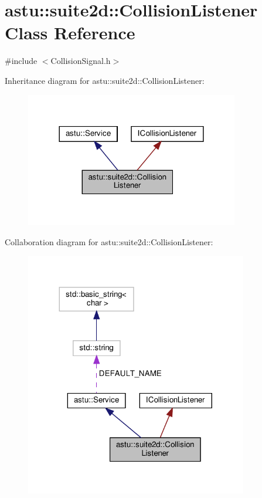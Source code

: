 \hypertarget{classastu_1_1suite2d_1_1CollisionListener}{}\section{astu\+:\+:suite2d\+:\+:Collision\+Listener Class Reference}
\label{classastu_1_1suite2d_1_1CollisionListener}


{\ttfamily \#include $<$Collision\+Signal.\+h$>$}



Inheritance diagram for astu\+:\+:suite2d\+:\+:Collision\+Listener\+:\nopagebreak
\begin{figure}[H]
\begin{center}
\leavevmode
\includegraphics[width=264pt]{classastu_1_1suite2d_1_1CollisionListener__inherit__graph}
\end{center}
\end{figure}


Collaboration diagram for astu\+:\+:suite2d\+:\+:Collision\+Listener\+:\nopagebreak
\begin{figure}[H]
\begin{center}
\leavevmode
\includegraphics[width=275pt]{classastu_1_1suite2d_1_1CollisionListener__coll__graph}
\end{center}
\end{figure}

